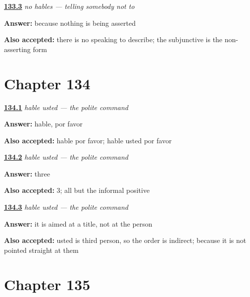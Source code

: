 \noindent\begin{minipage}[t]{\linewidth}
\raggedright
\hyperlink{review-ES-C50-no-hables-why}{\textbf{133.3}} \emph{no hables — telling somebody not to}\par
\small \textbf{Answer:} because nothing is being asserted\par
\footnotesize \textbf{Also accepted:} there is no speaking to describe; the subjunctive is the non-asserting form
\end{minipage}\par\medskip

\section*{Chapter 134}

\noindent\begin{minipage}[t]{\linewidth}
\raggedright
\hyperlink{review-ES-C50-hable-usted-say}{\textbf{134.1}} \emph{hable usted — the polite command}\par
\small \textbf{Answer:} hable, por favor\par
\footnotesize \textbf{Also accepted:} hable por favor; hable usted por favor
\end{minipage}\par\medskip

\noindent\begin{minipage}[t]{\linewidth}
\raggedright
\hyperlink{review-ES-C50-hable-usted-grid}{\textbf{134.2}} \emph{hable usted — the polite command}\par
\small \textbf{Answer:} three\par
\footnotesize \textbf{Also accepted:} 3; all but the informal positive
\end{minipage}\par\medskip

\noindent\begin{minipage}[t]{\linewidth}
\raggedright
\hyperlink{review-ES-C50-hable-usted-why}{\textbf{134.3}} \emph{hable usted — the polite command}\par
\small \textbf{Answer:} it is aimed at a title, not at the person\par
\footnotesize \textbf{Also accepted:} usted is third person, so the order is indirect; because it is not pointed straight at them
\end{minipage}\par\medskip

\section*{Chapter 135}

